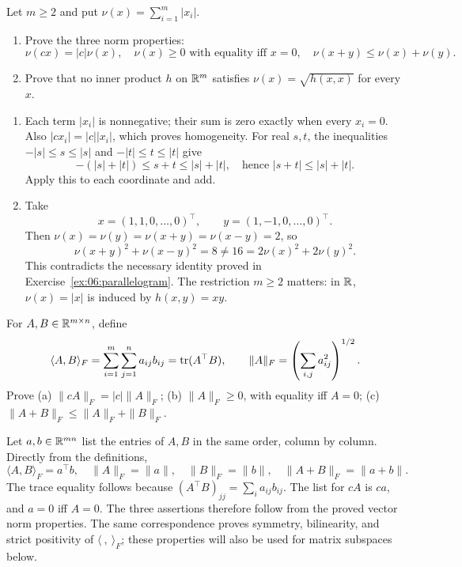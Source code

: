 \begin{problem}\label{ex:06:l1-norm}
Let \(m\geqslant2\) and put \(\nu(x)=\sum_{i=1}^m|x_i|\).
\begin{enumerate}
\item Prove the three norm properties:
\[
\nu(cx)=|c|\nu(x),\quad
\nu(x)\geqslant0\text{ with equality iff }x=0,\quad
\nu(x+y)\leqslant\nu(x)+\nu(y).
\]
\item Prove that no inner product \(h\) on \(\mathbb R^m\) satisfies
\(\nu(x)=\sqrt{h(x,x)}\) for every \(x\).
\end{enumerate}
\end{problem}
\begin{solution}
\begin{enumerate}
\item Each term \(|x_i|\) is nonnegative; their sum is zero exactly
when every \(x_i=0\). Also \(|cx_i|=|c||x_i|\), which proves homogeneity.
For real \(s,t\), the inequalities \(-|s|\leqslant s\leqslant|s|\)
and \(-|t|\leqslant t\leqslant|t|\) give
\[
-(|s|+|t|)\leqslant s+t\leqslant|s|+|t|,
\quad\text{hence }|s+t|\leqslant|s|+|t|.
\]
Apply this to each coordinate and add.
\item Take
\[
x=(1,1,0,\ldots,0)^\top,\qquad y=(1,-1,0,\ldots,0)^\top.
\]
Then \(\nu(x)=\nu(y)=\nu(x+y)=\nu(x-y)=2\), so
\[
\nu(x+y)^2+\nu(x-y)^2=8\ne16=2\nu(x)^2+2\nu(y)^2.
\]
This contradicts the necessary identity proved in
Exercise~\ref{ex:06:parallelogram}.
The restriction \(m\geqslant2\) matters: in \(\mathbb R\), \(\nu(x)=|x|\)
is induced by \(h(x,y)=xy\).
\end{enumerate}
\end{solution}

\begin{problem}\label{ex:06:frobenius-norm}
For \(A,B\in\mathbb R^{m\times n}\), define
\[
\langle A,B\rangle_F=\sum_{i=1}^m\sum_{j=1}^n a_{ij}b_{ij}
 =\operatorname{tr}(A^\top B),\qquad
\|A\|_F=\left(\sum_{i,j}a_{ij}^2\right)^{1/2}.
\]
Prove
(a) \(\|cA\|_F=|c|\|A\|_F\);
(b) \(\|A\|_F\geqslant0\), with equality iff \(A=0\);
(c) \(\|A+B\|_F\leqslant\|A\|_F+\|B\|_F\).
\end{problem}
\begin{solution}
Let \(a,b\in\mathbb R^{mn}\) list the entries of \(A,B\) in the same order,
column by column. Directly from the definitions,
\[
\langle A,B\rangle_F=a^\top b,\quad
\|A\|_F=\|a\|,\quad \|B\|_F=\|b\|,\quad \|A+B\|_F=\|a+b\|.
\]
The trace equality follows because
\((A^\top B)_{jj}=\sum_i a_{ij}b_{ij}\).
The list for \(cA\) is \(ca\), and \(a=0\) iff \(A=0\).
The three assertions therefore follow from the proved vector norm
properties. The same correspondence proves symmetry, bilinearity,
and strict positivity of \(\langle\ ,\ \rangle_F\);
these properties will also be used for matrix subspaces below.
\end{solution}

